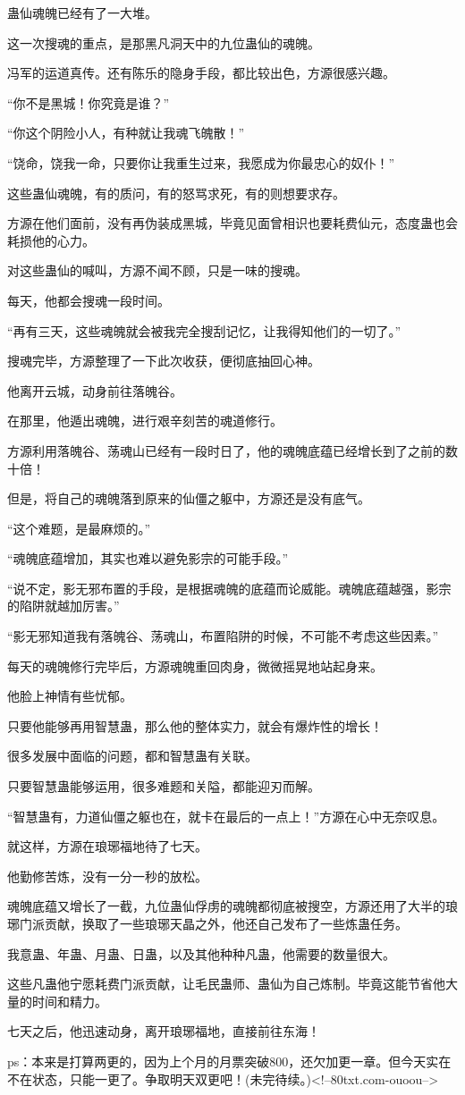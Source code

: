 \begin{this_body}
蛊仙魂魄已经有了一大堆。

这一次搜魂的重点，是那黑凡洞天中的九位蛊仙的魂魄。

冯军的运道真传。还有陈乐的隐身手段，都比较出色，方源很感兴趣。

“你不是黑城！你究竟是谁？”

“你这个阴险小人，有种就让我魂飞魄散！”

“饶命，饶我一命，只要你让我重生过来，我愿成为你最忠心的奴仆！”

这些蛊仙魂魄，有的质问，有的怒骂求死，有的则想要求存。

方源在他们面前，没有再伪装成黑城，毕竟见面曾相识也要耗费仙元，态度蛊也会耗损他的心力。

对这些蛊仙的喊叫，方源不闻不顾，只是一味的搜魂。

每天，他都会搜魂一段时间。

“再有三天，这些魂魄就会被我完全搜刮记忆，让我得知他们的一切了。”

搜魂完毕，方源整理了一下此次收获，便彻底抽回心神。

他离开云城，动身前往落魄谷。

在那里，他遁出魂魄，进行艰辛刻苦的魂道修行。

方源利用落魄谷、荡魂山已经有一段时日了，他的魂魄底蕴已经增长到了之前的数十倍！

但是，将自己的魂魄落到原来的仙僵之躯中，方源还是没有底气。

“这个难题，是最麻烦的。”

“魂魄底蕴增加，其实也难以避免影宗的可能手段。”

“说不定，影无邪布置的手段，是根据魂魄的底蕴而论威能。魂魄底蕴越强，影宗的陷阱就越加厉害。”

“影无邪知道我有落魄谷、荡魂山，布置陷阱的时候，不可能不考虑这些因素。”

每天的魂魄修行完毕后，方源魂魄重回肉身，微微摇晃地站起身来。

他脸上神情有些忧郁。

只要他能够再用智慧蛊，那么他的整体实力，就会有爆炸性的增长！

很多发展中面临的问题，都和智慧蛊有关联。

只要智慧蛊能够运用，很多难题和关隘，都能迎刃而解。

“智慧蛊有，力道仙僵之躯也在，就卡在最后的一点上！”方源在心中无奈叹息。

就这样，方源在琅琊福地待了七天。

他勤修苦炼，没有一分一秒的放松。

魂魄底蕴又增长了一截，九位蛊仙俘虏的魂魄都彻底被搜空，方源还用了大半的琅琊门派贡献，换取了一些琅琊天晶之外，他还自己发布了一些炼蛊任务。

我意蛊、年蛊、月蛊、日蛊，以及其他种种凡蛊，他需要的数量很大。

这些凡蛊他宁愿耗费门派贡献，让毛民蛊师、蛊仙为自己炼制。毕竟这能节省他大量的时间和精力。

七天之后，他迅速动身，离开琅琊福地，直接前往东海！

ps：本来是打算两更的，因为上个月的月票突破800，还欠加更一章。但今天实在不在状态，只能一更了。争取明天双更吧！(未完待续。)<!--80txt.com-ouoou-->

\end{this_body}

